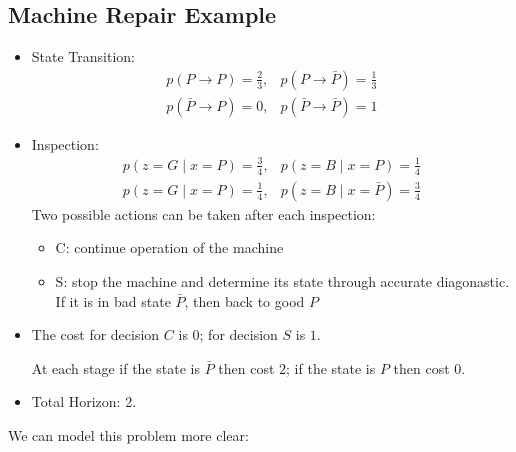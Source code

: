 \subsection{Machine Repair Example}
\begin{itemize}
\item
State Transition:
\[
\begin{array}{ll}
p(P\to P) = \frac{2}{3},&p(P\to\bar{P})=\frac{1}{3}\\
p(\bar{P}\to {P})=0,&p(\bar{P}\to \bar{P})=1
\end{array}
\]
\item
Inspection:
\[
\begin{array}{ll}
p(z=G\mid x=P) = \frac{3}{4},&p(z=B\mid x=P) = \frac{1}{4}\\
p(z=G\mid x=P) = \frac{1}{4},&p(z=B\mid x=\bar{P}) = \frac{3}{4}
\end{array}
\]
Two possible actions can be taken after each inspection:
\begin{itemize}
\item
C: continue operation of the machine
\item
S: stop the machine and determine its state through accurate diagonastic.
If it is in bad state $\bar{P}$, then back to good $P$
\end{itemize}
\item
The cost for decision $C$ is $0$; for decision $S$ is $1$.

At each stage if the state is $\bar{P}$ then cost $2$; if the state is $P$ then cost $0$.
\item
Total Horizon: 2.
\end{itemize}
We can model this problem more clear:
